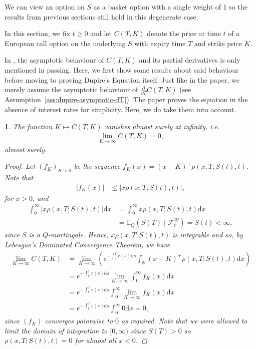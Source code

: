 \documentclass[english]{article}
\numberwithin{equation}{section}
\numberwithin{figure}{section}
\theoremstyle{bolddescit}
\newtheorem{theorem}{\protect\theoremname}[section]
\theoremstyle{definition}
\theoremstyle{definition}
\theoremstyle{plain}
\theoremstyle{plain}
\theoremstyle{bolddesc}
\theoremstyle{plain}
\theoremstyle{remark}
\providecommand{\theoremname}{Theorem}
\begin{document}
We can view an option on $S$ as a basket option with a single weight of 1 so the results from previous sections still hold in this degenerate case.

In this section, we fix $t \ge 0$ and let $C(T,K)$ denote the price at time $t$ of a European call option on the underlying $S$ with expiry time $T$ and strike price $K$.

In \textcite{dupire_pricing_1993}, the asymptotic behaviour of $C(T,K)$ and its partial derivatives is only mentioned in passing. Here, we first show some results about said behaviour before moving to proving Dupire's Equation itself. Just like in the paper, we merely assume the asymptotic behaviour of $\frac{\partial}{\partial T} C(T,K)$ (see Assumption~\ref{ass:dupire-asymptotic-dT}). The paper proves the equation in the absence of interest rates for simplicity. Here, we do take them into account.

\begin{theorem}\label{thm:dupire-asymptotic}
  The function $K \mapsto C(T,K)$ vanishes almost surely at infinity, i.e.
  \begin{align*}
    \lim_{K \to \infty} C(T,K) = 0,
  \end{align*}
  almost surely.

  \begin{proof}
    Let $(f_K)_{K > 0}$ be the sequence $f_K(x) = (x-K)^+ \rho(x,T;S(t),t)$. Note that
    \begin{align*}
      |f_K(x)|
      &\le |x \rho(x,T;S(t),t)|,
    \end{align*}
    for $x > 0$, and
    \begin{align*}
      \int_0^\infty |x\rho(x,T;S(t),t)| \mathrm{d}x
      &= \int_0^\infty x\rho(x,T;S(t),t) \mathrm{d}x \tag{positive integrand}\\
      &= \mathbb{E}_Q(S(T) \mid \mathcal{F}^W_t)
      = S(t) < \infty,
    \end{align*}
    since $S$ is a $Q$-martingale. Hence, $x \rho(x,T;S(t),t)$ is integrable and so, by Lebesgue's Dominated Convergence Theorem, we have
    \begin{align*}
      \lim_{K \to \infty} C(T,K)
      &= \lim_{K \to \infty} \left(e^{-\int_t^T r(s) \mathrm{d}s} \int_\mathbb{R} (x-K)^+ \rho(x,T;S(t),t) \mathrm{d}x\right) \\
      &= e^{-\int_t^T r(s) \mathrm{d}s} \lim_{K \to \infty} \int_0^\infty f_K(x) \mathrm{d}x\\
      &= e^{-\int_t^T r(s) \mathrm{d}s} \int_0^\infty \lim_{K \to \infty} f_K(x) \mathrm{d}x\\
      &= e^{-\int_t^T r(s) \mathrm{d}s} \int_0^\infty 0 \mathrm{d}x = 0,
    \end{align*}
    since $(f_K)$ converges pointwise to $0$ as required. Note that we were allowed to limit the domain of integration to $[0,\infty)$ since $S(T) > 0$ so $\rho(x,T;S(t),t) = 0$ for almost all $x < 0$.
  \end{proof}
\end{theorem}
\end{document}
